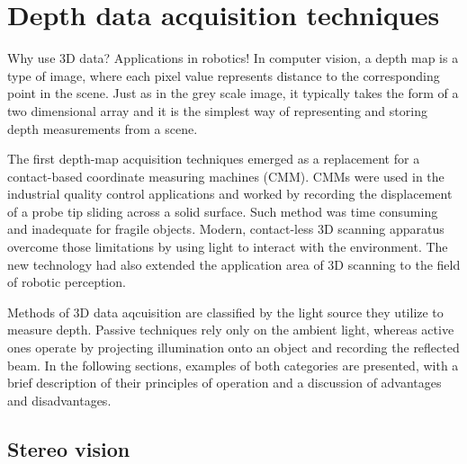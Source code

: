 \chapter{Depth data acquisition techniques}
\label{cha:acquisition}

Why use 3D data? Applications in robotics!
In computer vision, a depth map is a type of image, where each pixel value represents distance to the corresponding point in the scene. Just as in the grey scale image, it typically takes the form of a two dimensional array and it is the simplest way of representing and storing depth measurements from a scene.

The first depth-map acquisition techniques emerged as a replacement for a contact-based coordinate measuring machines (CMM). CMMs were used in the industrial quality control applications and worked by recording the displacement of a probe tip sliding across a solid surface. Such method was time consuming and inadequate for fragile objects. Modern, contact-less 3D scanning apparatus overcome those limitations by using light to interact with the environment. The new technology had also extended the application area of 3D scanning to the field of robotic perception.

Methods of 3D data aqcuisition are classified by the light source they utilize to measure depth. Passive techniques rely only on the ambient light, whereas active ones operate by projecting illumination onto an object and recording the reflected beam. In the following sections, examples of both categories are presented, with a brief description of their principles of operation and a discussion of advantages and disadvantages.


\section{Stereo vision}
\label{sec:stereo}

